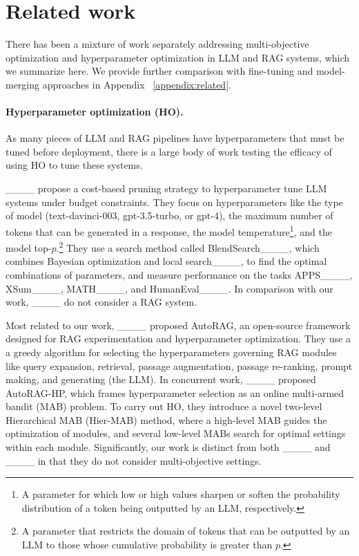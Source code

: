 \section{Related work}
\label{sec:related}
There has been a mixture of work separately addressing multi-objective optimization and hyperparameter optimization in LLM and RAG systems, which we summarize here. We provide further comparison with fine-tuning and model-merging approaches in Appendix ~\ref{appendix:related}.

\paragraph{Hyperparameter optimization (HO).} As many pieces of LLM and RAG pipelines have hyperparameters that must be tuned before deployment, there is a large body of work testing the efficacy of using HO to tune these systems. %

____ propose a cost-based pruning strategy to hyperparameter tune LLM systems under budget constraints. They focus on hyperparameters like the type of model (\eg text-davinci-003, gpt-3.5-turbo, or gpt-4), the maximum number of tokens that can be generated in a response, the model temperature\footnote{A parameter for which low or high values sharpen or soften the probability distribution of a token being outputted by an LLM, respectively.}, and the model top-$p$.\footnote{A parameter that restricts the domain of tokens that can be outputted by an LLM to those whose cumulative probability is greater than $p$.} They use a search method called BlendSearch____, which combines Bayesian optimization and local search____, to find the optimal combinations of parameters, and measure performance on the tasks APPS____, XSum____, MATH____, and HumanEval____. In comparison with our work, ____ do not consider a RAG system.

Most related to our work, ____ proposed AutoRAG, an open-source framework designed for RAG experimentation and hyperparameter optimization. They use a a greedy algorithm for selecting the hyperparameters governing RAG modules like query expansion, retrieval, passage augmentation, passage re-ranking, prompt making, and generating (the LLM). In concurrent work, ____ proposed AutoRAG-HP, which frames hyperparameter selection as an online multi-armed bandit (MAB) problem. To carry out HO, they introduce a novel two-level Hierarchical MAB (Hier-MAB) method, where a high-level MAB guides the optimization of modules, and several low-level MABs search for optimal settings within each module. Significantly, our work is distinct from both ____ and ____ in that they do not consider multi-objective settings.

